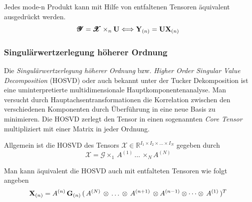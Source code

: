 \begin{Bemerkung}
Jedes mode-n Produkt kann mit Hilfe von entfaltenen Tensoren äquivalent ausgedrückt werden.
\begin{equation}
\pmb{\mathscr{Y}} = \pmb{\mathscr{X}} \times_n \bold{U} \Longleftrightarrow \bold{Y}_{(n)} = \bold{U} \bold{X}_{(n)}
\end{equation}
\end{Bemerkung}

\subsubsection{Singulärwertzerlegung höherer Ordnung}

Die \textit{Singulärwertzerlegung höherer Ordnung} bzw. \textit{Higher Order Singular Value Decomposition} (HOSVD) oder auch bekannt unter der Tucker Dekomposition ist eine uminterpretierte multidimensionale Hauptkomponentenanalyse. Man versucht durch Hauptachsentransformationen die Korrelation zwischen den verschiedenen Komponenten durch Überführung in eine neue Basis zu minimieren. 
Die HOSVD zerlegt den Tensor in einen sogenannten \textit{Core Tensor} multipliziert mit einer Matrix in jeder Ordnung. 

Allgemein ist die HOSVD des Tensors $\pmb{\mathscr{X}}  \in \mathbb{R}^{I_1 \times I_2 \times \dots \times I_N}$ gegeben durch
\begin{equation}
\pmb{\mathscr{X}}= \pmb{\mathscr{G}} \times_1 \, A^{(1)} \, \dots \, \times_N A^{(N)}
\end{equation}

Man kann äquivalent die HOSVD auch mit entfalteten Tensoren wie folgt angeben
\begin{equation}
\bold{X}_{(n)} = A^{(n)} \, \bold{G}_{(n)} \, ( \, A^{(N)} \, \otimes  \, \dots \, \otimes \, A^{(n+1)} \, \otimes A^{(n-1)} \otimes \dots \otimes \, A^{(1)} \, )^{T}
\end{equation}

